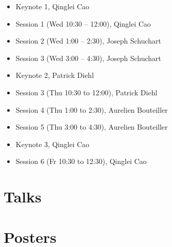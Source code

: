 \documentclass[12pt,letterpaper]{book}
\newenvironment{conf-abstract}[4][]{
 \needspace{10\baselineskip}
 \begin{center}
 { \renewcommand\textsuperscript[1]{}
 \phantomsection\addcontentsline{toc}{section}
 {\texorpdfstring{#2 (\emph{#3})}{#2 (#3)}}
 }
 {{\large\bfseries #2}\marginnote{#1}\par}
 \medskip
 {#3\par}
 \smallskip
 {\small #4\par}
 \end{center}
}{%
 \bigskip
 \hrule
 \bigskip
}
\newcommand{\indexauthors}[1]{%
 \forcsvlist{\index}{#1}
}
\begin{document}
\begin{itemize}
\item Keynote 1, Qinglei Cao 
\item Session 1 (Wed 10:30 -- 12:00), Qinglei Cao
\item Session 2 (Wed 1:00 -- 2:30),  Joseph Schuchart
\item Session 3 (Wed 3:00 -- 4:30), Joseph Schuchart
\item Keynote 2, Patrick Diehl
\item Session 3 (Thu 10:30 to 12:00), Patrick Diehl
\item Session 4 (Thu 1:00 to 2:30), Aurelien Bouteiller
\item Session 5 (Thu 3:00 to 4:30), Aurelien Bouteiller
\item Keynote 3, Qinglei Cao
\item Session 6 (Fr 10:30 to 12:30), Qinglei Cao
\end{itemize}

\chapter{Talks}

{
\begin{conf-abstract}[\datum\\\tiny\time]
{\title}
{\first~ \last}
{\affiliation}
\indexauthors{\last~\first}

\newpage
\end{conf-abstract}
}

\chapter{Posters}

{
\def\x{\last}
\def\y{\substring{\x}{1}{1}\par}
\begin{conf-abstract}[\datum\\\time]
{\title}
{\first~\last}
{\affiliation}
\indexauthors{\last~\first}
\begin{center}

\end{center}
\end{conf-abstract}
}


%
\end{document}
